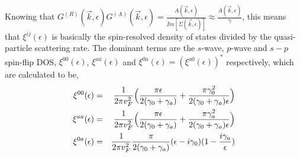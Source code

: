 \documentclass[letter,12pt,preprint,aps]{revtex4-1}
\newcommand{\ba}{\begin{eqnarray}}
\newcommand{\ea}{\end{eqnarray}}
\begin{document}
Knowing that $G^{(R)}(\vec{k}, \epsilon) G^{(A)}(\vec{k}, \epsilon) = \tfrac{A(\vec{k}, \epsilon)}{Im[\Sigma(\vec{k}, \epsilon)]} \approx \tfrac{A(\vec{k}, \epsilon)}{\gamma}$, this means that $\xi^{ij}(\epsilon)$ is basically the spin-resolved density of states divided by the quasi-particle scattering rate. The dominant terms are the $s$-wave, $p$-wave and $s-p$ spin-flip DOS, $\xi^{00}(\epsilon)$, $\xi^{aa}(\epsilon)$ and $\xi^{0a}(\epsilon) = (\xi^{a0}(\epsilon))^*$ respectively, which are calculated to be,
%
\ba
\xi^{00}(\epsilon) & = & \frac{1}{2 \pi v_F^2} \Big( \frac{\pi \epsilon}{2 (\gamma_0 + \gamma_a)} + \frac{\pi \gamma_0^2}{2(\gamma_0 + \gamma_a) \epsilon} \Big) \cr
\xi^{aa}(\epsilon) & = & \frac{1}{2 \pi v_F^2} \Big( \frac{\pi \epsilon}{2 (\gamma_0 + \gamma_a)} + \frac{\pi \gamma_a^2}{2(\gamma_0 + \gamma_a) \epsilon} \Big) \cr
\xi^{0a}(\epsilon) & = & \frac{1}{2 \pi v_F^2} \frac{\pi}{2 (\gamma_0 + \gamma_a)} (\epsilon - i \gamma_0) (1 - \frac{i \gamma_a}{\epsilon})
\ea
\end{document}
